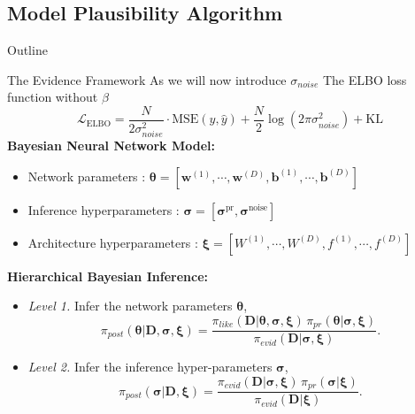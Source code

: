 \documentclass[8pt,xcolor=dvipsnames,compress]{beamer}
\begin{document}
\subsection{Model Plausibility Algorithm}
\begin{frame}{Outline}
\end{frame}
\begin{frame}{The Evidence Framework}
\scriptsize
As we will now introduce $\sigma_{noise}$ The ELBO loss function without $\beta$
\begin{equation}
\mathcal{L}_{\text{ELBO}} = \frac{N}{2\sigma_{noise}^2} \cdot \text{MSE}(y, \hat{y}) + \frac{N}{2} \log(2\pi \sigma_{noise}^2) + \text{KL}
\end{equation}
\textbf{Bayesian Neural Network Model:}
\begin{itemize}
    \item Network parameters \hspace{0.47 in}: $\boldsymbol \theta = [\boldsymbol w^{(1)}, \cdots, \boldsymbol w^{(D)}, \boldsymbol b^{(1)}, \cdots, \boldsymbol b^{(D)}]$
    \item Inference hyperparameters \hspace{0.17 in}: $\boldsymbol \sigma = [\boldsymbol \sigma^{\text{pr}}, \boldsymbol \sigma^{\text{noise}}]$
    \item Architecture hyperparameters \hspace{0.02 in}: $\boldsymbol \xi = [W^{(1)}, \cdots, W^{(D)}, f^{(1)}, \cdots, f^{(D)}]$
\end{itemize}
    \textbf{{Hierarchical Bayesian Inference:\footnotemark}}
\begin{itemize}
    \item \textit{Level 1.} Infer the network parameters $\boldsymbol \theta$,
    \begin{equation*}\label{eq:lev1}
    \pi_{post} (\boldsymbol \theta | \boldsymbol D, \boldsymbol \sigma, \boldsymbol \xi) = 
    \frac{\pi_{like} (\boldsymbol D| \boldsymbol \theta, \boldsymbol \sigma, \boldsymbol \xi) \,
    \pi_{pr} (\boldsymbol \theta| \boldsymbol \sigma, \boldsymbol \xi)}
    {\pi_{evid} (\boldsymbol D| \boldsymbol \sigma, \boldsymbol \xi)}.
    \end{equation*}


    \item \textit{Level 2.} Infer the inference hyper-parameters $\boldsymbol \sigma$,
    \begin{equation*}\label{eq:lev2}
    \pi_{post} (\boldsymbol \sigma | \boldsymbol D,  \boldsymbol \xi) = 
    \frac{\pi_{evid} (\boldsymbol D| \boldsymbol \sigma,  \boldsymbol \xi) \,
    \pi_{pr} (\boldsymbol \sigma |  \boldsymbol \xi)}
    {\pi_{evid} (\boldsymbol D|  \boldsymbol \xi)}.
    \end{equation*}



\end{itemize}
\end{frame}
\end{document}
